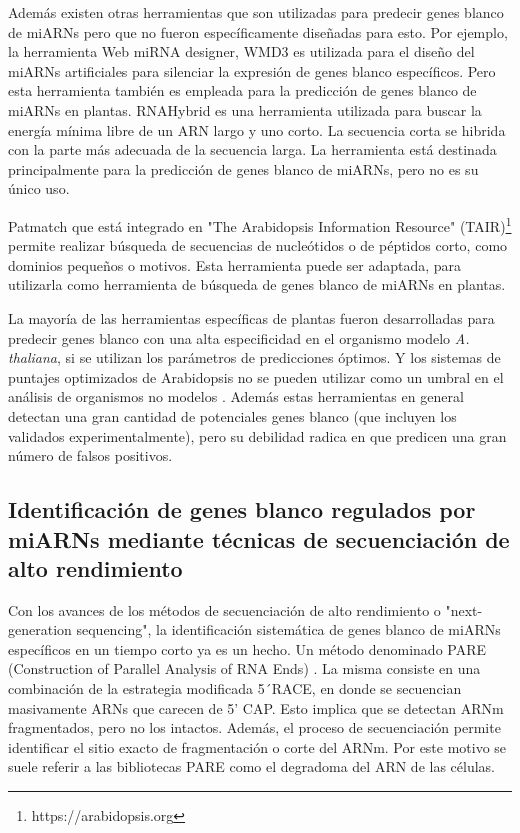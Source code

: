 Además existen otras herramientas que son utilizadas para predecir genes blanco de miARNs pero que no fueron específicamente diseñadas para esto.
Por ejemplo, la herramienta  Web miRNA designer, WMD3 \citep{pmid18269576} es utilizada para el diseño del miARNs artificiales para silenciar la expresión de genes blanco específicos.
Pero esta herramienta también es empleada para la predicción de genes blanco de miARNs en plantas.
RNAHybrid \citep{Kruger01072006} es una herramienta utilizada para buscar la energía mínima libre de un ARN largo y uno corto.
La secuencia corta se hibrida con la parte más adecuada de la secuencia larga.
La herramienta está destinada principalmente para la predicción de genes blanco de miARNs, pero no es su único uso.

Patmatch \citep{Yan01072005} que está integrado en "The Arabidopsis Information Resource" (TAIR)\footnote{https://arabidopsis.org} permite realizar búsqueda de secuencias de nucleótidos o de péptidos corto, como dominios pequeños o motivos.
Esta herramienta puede ser adaptada, para utilizarla como herramienta de búsqueda de genes blanco de miARNs en plantas.

La mayoría de las herramientas específicas de plantas fueron desarrolladas para predecir genes blanco con una alta especificidad en el organismo modelo \textit{A. thaliana}, si se utilizan los parámetros de predicciones óptimos.
Y los sistemas de puntajes optimizados de Arabidopsis no se pueden utilizar como un umbral en el análisis de organismos no modelos \citep{pmid24885295}.
Además estas herramientas en general detectan una gran cantidad de potenciales genes blanco (que incluyen los validados experimentalmente), pero su debilidad radica en que predicen una gran número de falsos positivos.

\subsection{Identificación de genes blanco regulados por miARNs mediante técnicas de secuenciación de alto rendimiento}
Con los avances de los métodos de secuenciación de alto rendimiento o "next-generation sequencing", la identificación sistemática de genes blanco de miARNs específicos en un tiempo corto ya es un hecho.
Un método denominado PARE (Construction of Parallel Analysis of RNA Ends) \citep{pmid19247285}.
La misma consiste en una combinación de la estrategia modificada 5´RACE, en donde se secuencian masivamente ARNs que carecen de 5’ CAP.
Esto implica que se detectan ARNm fragmentados, pero no los intactos.
Además, el proceso de secuenciación permite identificar el sitio exacto de fragmentación o corte del ARNm.
Por este motivo se suele referir a las bibliotecas PARE como el degradoma del ARN de las células. 

